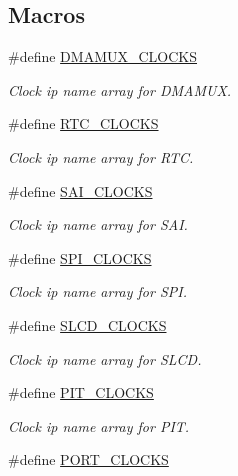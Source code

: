 \subsection*{Macros}
\begin{DoxyCompactItemize}
\item 
\#define \mbox{\hyperlink{group__clock_ga28b35d2fe49bfffe6e5e41fbdadfc6ed}{D\+M\+A\+M\+U\+X\+\_\+\+C\+L\+O\+C\+KS}}
\begin{DoxyCompactList}\small\item\em Clock ip name array for D\+M\+A\+M\+UX. \end{DoxyCompactList}\item 
\#define \mbox{\hyperlink{group__clock_ga426bb38a06d4765b5a11c5513a583481}{R\+T\+C\+\_\+\+C\+L\+O\+C\+KS}}
\begin{DoxyCompactList}\small\item\em Clock ip name array for R\+TC. \end{DoxyCompactList}\item 
\#define \mbox{\hyperlink{group__clock_gab3f24de813a146fd05809f0c969b1b16}{S\+A\+I\+\_\+\+C\+L\+O\+C\+KS}}
\begin{DoxyCompactList}\small\item\em Clock ip name array for S\+AI. \end{DoxyCompactList}\item 
\#define \mbox{\hyperlink{group__clock_ga2323a706e6e7796fa2e352a5b5a70f59}{S\+P\+I\+\_\+\+C\+L\+O\+C\+KS}}
\begin{DoxyCompactList}\small\item\em Clock ip name array for S\+PI. \end{DoxyCompactList}\item 
\#define \mbox{\hyperlink{group__clock_gac73fecf7d904351cc47b66f332299800}{S\+L\+C\+D\+\_\+\+C\+L\+O\+C\+KS}}
\begin{DoxyCompactList}\small\item\em Clock ip name array for S\+L\+CD. \end{DoxyCompactList}\item 
\#define \mbox{\hyperlink{group__clock_ga59f69fda6fd2733de3bd37cb7c179129}{P\+I\+T\+\_\+\+C\+L\+O\+C\+KS}}
\begin{DoxyCompactList}\small\item\em Clock ip name array for P\+IT. \end{DoxyCompactList}\item 
\#define \mbox{\hyperlink{group__clock_ga6365ac4acbb9de0497f74ca189595836}{P\+O\+R\+T\+\_\+\+C\+L\+O\+C\+KS}}

\end{DoxyCompactItemize}
